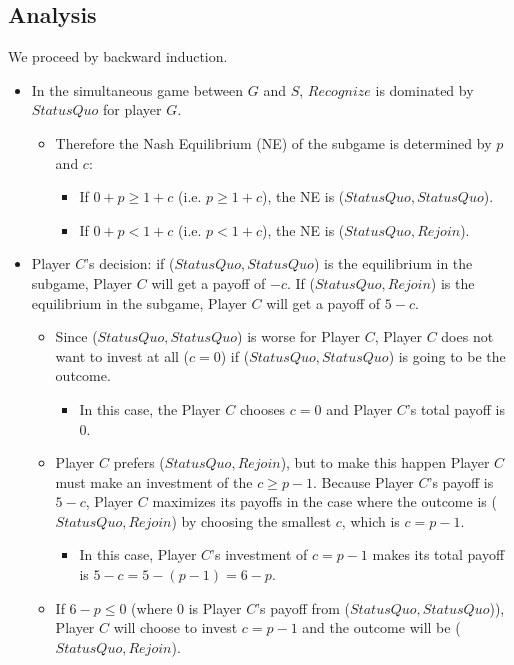 \documentclass[12pt]{article}
\begin{document}
\subsection{Analysis}
We proceed by backward induction.
\begin{itemize}
	\item In the simultaneous game between $G$ and $S$, $Recognize$ is dominated by $Status Quo$ for player $G$.
		\begin{itemize}
			\item Therefore the Nash Equilibrium (NE) of the subgame is determined by $p$ and $c$: 
				\begin{itemize}
					\item If $0+p \geq 1+c$ (i.e. $p \geq 1+c$), the NE is ($Status Quo,Status Quo$).
					\item If $0+p < 1+c$ (i.e. $p < 1+c$), the NE is ($Status Quo,Rejoin$).
				\end{itemize}
		\end{itemize}
	\item Player $C$'s decision: if ($Status Quo,Status Quo$) is the equilibrium in the subgame, Player $C$ will get a payoff of $-c$. If ($Status Quo,Rejoin$) is the equilibrium in the subgame, Player $C$ will get a payoff of $5-c$.
		\begin{itemize}
			\item Since ($Status Quo,Status Quo$) is worse for Player $C$, Player $C$ does not want to invest at all ($c=0$) if ($Status Quo,Status Quo$) is going to be the outcome. 
				\begin{itemize}
					\item In this case, the Player $C$ chooses $c=0$ and Player $C$'s total payoff is $0$.
				\end{itemize}
			\item Player $C$ prefers ($Status Quo,Rejoin$), but to make this happen Player $C$ must make an investment of the $c \geq p - 1$. Because Player $C$'s payoff is $5-c$, Player $C$ maximizes its payoffs in the case where the outcome is ($Status Quo,Rejoin$) by choosing the smallest $c$, which is $c=p-1$. 
				\begin{itemize}
					\item In this case, Player $C$'s investment of $c=p-1$ makes its total payoff is $5-c = 5 - (p -1) = 6-p$.
				\end{itemize}
			\item If $6 - p \leq 0$ (where $0$ is Player $C$'s payoff from ($Status Quo,Status Quo$)), Player $C$ will choose to invest $c = p-1$ and the outcome will be ($Status Quo,Rejoin$).

\end{itemize}
\end{itemize}
\end{document}
